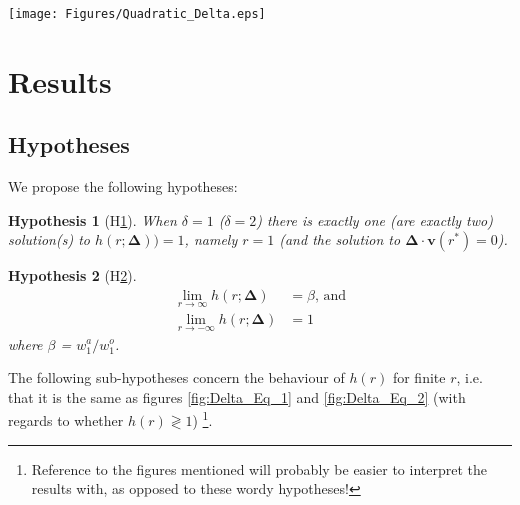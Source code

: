 \documentclass[10pt,journal,compsoc]{IEEEtran}
\newtheorem{hyp}{Hypothesis}
\begin{document}
\begin{minipage}{\linewidth}
\centering
\texttt{[image: Figures/Quadratic\_Delta.eps]}
\label{fig:Quadratic_Delta}
\end{minipage}

\section{Results}\label{sect:Results}

\subsection{Hypotheses}\label{sect:Hypotheses}

We propose the following hypotheses:

\begin{hyp}[H\ref{hyp:first}] \label{hyp:first}
When $\delta=1$ ($\delta=2$) there is exactly one (are exactly two) solution(s) to $h(r; \boldsymbol{\Delta}))=1$, namely $r=1$ (and the solution to $\boldsymbol{\Delta} \cdot \boldsymbol{v}(r^*)=0$).
\end{hyp}
\begin{hyp}[H\ref{hyp:second}]
\label{hyp:second}
\begin{align*}
    \lim_{r\rightarrow \infty}h(r; \boldsymbol{\Delta})&=\beta \text{, and} \\
    \lim_{r\rightarrow -\infty}h(r; \boldsymbol{\Delta})&=1
\end{align*}
where $\beta$ = $w_1^a/w_1^o$.
\end{hyp}
The following sub-hypotheses concern the behaviour of $h(r)$ for finite $r$, i.e. that it is the same as figures \ref{fig:Delta_Eq_1} and \ref{fig:Delta_Eq_2} (with regards to whether $h(r) \gtrless 1$) \footnote{Reference to the figures mentioned will probably be easier to interpret the results with, as opposed to these wordy hypotheses!}.
\end{document}
